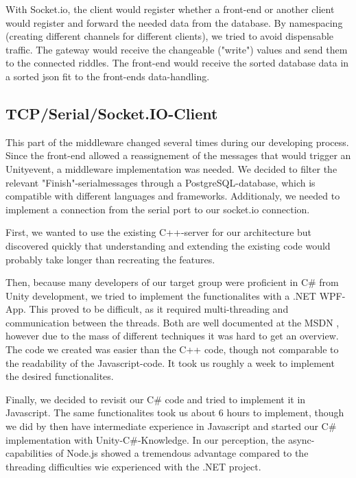 With Socket.io, the client would register whether a front-end or another client would register and forward the needed data from the database. 
By namespacing (creating different channels for different clients), we tried to avoid dispensable traffic.
The gateway would receive the changeable ("write") values and send them to the connected riddles.
The front-end would receive the sorted database data in a sorted json fit to the front-ends data-handling.

\subsection{TCP/Serial/Socket.IO-Client}
This part of the middleware changed several times during our developing process. 
Since the front-end allowed a reassignement of the messages that would trigger an Unityevent, a middleware implementation was needed.
We decided to filter the relevant "Finish"-serialmessages through a PostgreSQL-database, which is compatible with different languages and frameworks.
Additionaly, we needed to implement a connection from the serial port to our socket.io connection.

First, we wanted to use the existing C++-server for our architecture but discovered quickly that understanding and extending the existing code would probably take longer than recreating the features.

Then, because many developers of our target group were proficient in C\# from Unity development, we tried to implement the functionalites with a .NET WPF-App.
This proved to be difficult, as it required multi-threading and communication between the threads. Both are well documented at the MSDN \parencite{MSDN}, 
however due to the mass of different techniques it was hard to get an overview. 
The code we created was easier than the C++ code, though not comparable to the readability of the Javascript-code.
It took us roughly a week to implement the desired functionalites. 

Finally, we decided to revisit our C\# code and tried to implement it in Javascript.
The same functionalites took us about 6 hours to implement, though we did by then have intermediate experience in Javascript and started our C\# implementation with Unity-C\#-Knowledge.
In our perception, the async-capabilities of Node.js showed a tremendous advantage compared to the threading difficulties wie experienced with the .NET project.

